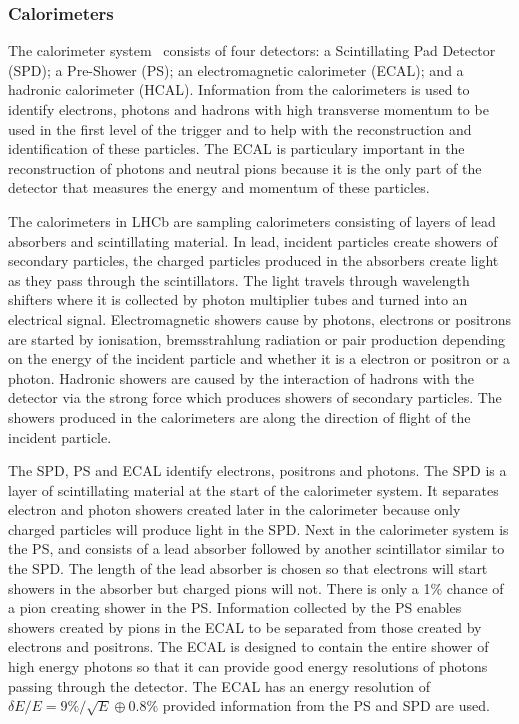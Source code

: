 \subsubsection{Calorimeters}
\label{Calo}

The calorimeter system~\cite{LHCB:2000ab} consists of four detectors: a Scintillating Pad Detector (SPD); a Pre-Shower (PS); an electromagnetic calorimeter (ECAL); and a hadronic calorimeter (HCAL). Information from the calorimeters is used to identify electrons, photons and hadrons with high transverse momentum to be used in the first level of the trigger and to help with the reconstruction and identification of these particles. The ECAL is particulary important in the reconstruction of photons and neutral pions because it is the only part of the detector that measures the energy and momentum of these particles. 

The calorimeters in LHCb are sampling calorimeters consisting of layers of lead absorbers and scintillating material. In lead, incident particles create showers of secondary particles, the charged particles produced in the absorbers create light as they pass through the scintillators. The light travels through wavelength shifters where it is collected by photon multiplier tubes and turned into an electrical signal. Electromagnetic showers cause by photons, electrons or positrons are started by ionisation, bremsstrahlung radiation or pair production depending on the energy of the incident particle and whether it is a electron or positron or a photon. Hadronic showers are caused by the interaction of hadrons with the detector via the strong force which produces showers of secondary particles. The showers produced in the calorimeters are along the direction of flight of the incident particle. %

The SPD, PS and ECAL identify electrons, positrons and photons. The SPD is a layer of scintillating material at the start of the calorimeter system. It separates electron and photon showers created later in the calorimeter because only charged particles will produce light in the SPD. Next in the calorimeter system is the PS, and consists of a lead absorber followed by another scintillator similar to the SPD. The length of the lead absorber is chosen so that electrons will start showers in the absorber but charged pions will not. There is only a 1$\%$ chance of a pion creating shower in the PS. Information collected by the PS enables showers created by pions in the ECAL to be separated from those created by electrons and positrons. The ECAL is designed to contain the entire shower of high energy photons so that it can provide good energy resolutions of photons passing through the detector. The ECAL has an energy resolution of $\delta E / E = 9\%/\sqrt{E} \oplus 0.8\%$  provided information from the PS and SPD are used. 


